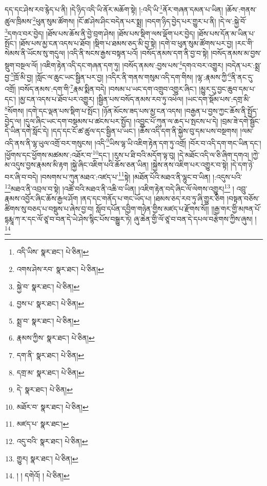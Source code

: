 དད་དང་ཤེས་རབ་རྙེད་པ་ནི། །དེ་ཉིད་འདི་ཡི་ནོར་མཆོག་སྟེ། །:འདི་ཡི་\footnote{འདི་ཡིས་  སྣར་ཐང་།  པེ་ཅིན། }ནོར་གཞན་དམན་པ་ཡིན། །ཆོས་:གནས་ཚུལ་ཁྲིམས་\footnote{འགས་ཤེས་རབ་  སྣར་ཐང་།  པེ་ཅིན། }ཕུན་སུམ་ཚོགས། །ངོ་ཚ་ཤེས་ཤིང་བདེན་པར་སྨྲ། །བདག་ཉིད་བྱེད་པར་གྱུར་པ་ནི། །དེ་ལ་:སྐྱེ་བོ་\footnote{སྐྱེ་བ་  སྣར་ཐང་།  པེ་ཅིན། }དགའ་བར་བྱེད། །ཐོས་པས་ཆོས་ནི་བྱེ་བྲག་ཤེས། །ཐོས་པས་སྡིག་ལས་ལྡོག་པར་བྱེད། །ཐོས་པས་དོན་མ་ཡིན་པ་སྤོང་། །ཐོས་པས་མྱ་ངན་འདས་པ་ཐོབ། །སྡིག་པ་ཐམས་ཅད་མི་བྱ་སྟེ། །དགེ་བ་ཕུན་སུམ་ཚོགས་པར་བྱ། །རང་གི་སེམས་ནི་ཡོངས་སུ་གདུལ། །འདི་ནི་སངས་རྒྱས་བསྟན་པའོ། །བསོད་ནམས་དག་ནི་བྱ་བ་སྟེ། །བསོད་ནམས་མ་བྱས་སྡུག་བསྔལ་ལོ། །འཇིག་རྟེན་འདི་དང་གཞན་དག་ཏུ། །བསོད་ནམས་:བྱས་པས་\footnote{བྱས་པ་  སྣར་ཐང་།  པེ་ཅིན། }དགའ་བར་འགྱུར། །བདེན་པར་:སྨྲ་བྱ་\footnote{སྨྲ་བ་  སྣར་ཐང་།  པེ་ཅིན། }ཁྲོ་མི་བྱ། །སློང་ལ་ཆུང་ཡང་སྦྱིན་པར་བྱ། །འདིར་ནི་གནས་གསུམ་འདི་དག་གིས། །ལྷ་:རྣམས་ཀྱི་\footnote{རྣམས་ཀྱིས་  སྣར་ཐང་།  པེ་ཅིན། }ནི་ནང་དུ་འགྲོ། །བསོད་ནམས་:དག་གི་\footnote{དག་ནི་  སྣར་ཐང་།  པེ་ཅིན། }རྣམ་སྨིན་བདེ། །བསམ་པ་ཡང་དག་འགྲུབ་འགྱུར་ཞིང་། །མྱུར་དུ་བྱང་ཆུབ་དམ་པ་དང་། །མྱ་ངན་འདས་པ་ཐོབ་པར་འགྱུར། །སྦྱིན་པས་བསོད་ནམས་རབ་ཏུ་འཕེལ། །ཡང་དག་སྡོམ་པས་:དགྲ་མི་\footnote{དགྲ་མ་  སྣར་ཐང་།  པེ་ཅིན། }སོགས། །དགེ་དང་ལྡན་པས་སྡིག་པ་སྤོང་། །ཉོན་མོངས་ཟད་པས་མྱ་ངན་འདས། །བརྒྱན་པ་བྱས་ཀྱང་ཆོས་ནི་སྤྱོད་བྱེད་ལ། །དུལ་ཞིང་ཡང་དག་བསྡམས་པ་ཚངས་པར་སྤྱོད། །འབྱུང་པོ་ཀུན་ལ་ཆད་པ་སྤངས་པ་དེ། །བྲམ་ཟེ་དགེ་སྦྱོང་དེ་ཡིན་དགེ་སློང་དེ། །དད་དང་ངོ་ཚ་ཚུལ་དང་སྦྱིན་པ་ཡང་། །ཆོས་འདི་དག་ནི་སྐྱེས་བུ་དམ་པས་བསྔགས། །ལམ་འདི་ནས་ནི་ལྷ་ཡུལ་འགྲོ་བར་གསུངས། །འདི་\footnote{དེ་  སྣར་ཐང་།  པེ་ཅིན། }ཡིས་ལྷ་ཡི་འཇིག་རྟེན་དག་ཏུ་འགྲོ། །བོར་བ་འདི་དག་གང་ཡིན་དང་། །ཕྱོགས་དང་ཕྱོགས་མཚམས་:འཐོར་བ་\footnote{མཐོར་བ་  སྣར་ཐང་།  པེ་ཅིན། }དང་། །རུས་པ་ཐི་བའི་མདོག་ལྟ་བུ། །དེ་མཐོང་འདི་ལ་ཅི་ཞིག་དགའ། །ཀྱེ་མ་འདུས་བྱས་རྣམས་མི་རྟག །སྐྱེ་ཞིང་འཇིག་པའི་ཆོས་ཅན་ཡིན། །སྐྱེས་ནས་འཇིག་པར་འགྱུར་བ་སྟེ། །དེ་དག་ཉེ་བར་ཞི་བ་བདེ། །བསགས་པ་ཀུན་མཐའ་:འཛད་པ་\footnote{མཛད་པ་  སྣར་ཐང་། }སྟེ། །མཐོན་པོའི་མཐའ་ནི་ལྷུང་བ་ཡིན། །:འདུས་པའི་\footnote{འདུ་བའི་  སྣར་ཐང་།  པེ་ཅིན། }མཐའ་ནི་འབྲལ་བ་སྟེ། །འཚོ་བའི་མཐའ་ནི་འཆི་བ་ཡིན། །འཇིག་རྟེན་བདེ་ཞིང་ལོ་ལེགས་འགྱུར།\footnote{གྱུར།  སྣར་ཐང་།  པེ་ཅིན། } །
འབྲུ་རྣམས་འབྱོར་ཞིང་ཆོས་རྒྱལ་ཤོག །ནད་དང་གནོད་པ་གང་ཡོད་པ། །ཐམས་ཅད་རབ་ཏུ་ཞི་གྱུར་ཅིག །བསྟན་བཅོས་ཚིགས་སུ་བཅད་པ་བསྡུས་པ་ཞེས་བྱ་བ། སློབ་དཔོན་དབྱིག་གཉེན་གྱིས་མཛད་པ་རྫོགས་སོ།། །།རྒྱ་གར་གྱི་མཁན་པོ་དྷརྨཱ་ཀ་ར་དང་ལོ་ཙཱ་བ་བན་དེ་ཡེ་ཤེས་སྙིང་པོས་བསྒྱུར་ཏེ། ཞུ་ཆེན་གྱི་ལོ་ཙཱ་བ་བན་དེ་དཔལ་བརྩེགས་ཀྱིས་ཞུས། ། \footnote{། ། དགེའོ། །  པེ་ཅིན། }